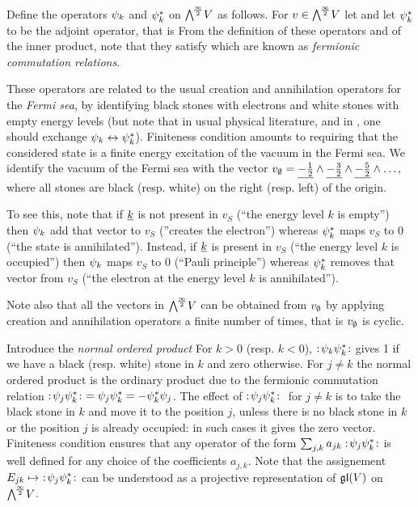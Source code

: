 \documentclass[../main/main.tex]{subfiles}
\begin{document}
Define the operators $\psi_k$ and $\psi_k^*$ on $\bigwedge^{\!\frac\infty2}\!V$ as follows. For $v\in\bigwedge^{\!\frac\infty2}\!V$ let
and let $\psi_k^*$ to be the adjoint operator, that is \st
{}
From the definition of these operators and of the inner product, note that they satisfy
which are known as \emph{fermionic commutation relations}. 

These operators are related to the usual creation and annihilation operators for the \emph{Fermi sea}, by identifying black stones with electrons and white stones with empty energy levels (but note that in usual physical literature, and in \cite{MJD}, one should exchange $\psi_k\leftrightarrow\psi_k^*$). Finiteness condition amounts to requiring that the considered state is a finite energy excitation of the vacuum in the Fermi sea. We identify the vacuum of the Fermi sea with the vector $v_\emptyset=\underline{-\frac12}\wedge\underline{-\frac32}\wedge\underline{-\frac52}\wedge\ldots$, where all stones are black (resp. white) on the right (resp. left) of the origin.

To see this, note that if $\underline{k}$ is not present in $v_S$ (``the energy level $k$ is empty'') then $\psi_k$ add that vector to $v_S$ (''creates the electron'') whereas $\psi_k^*$ maps $v_S$ to 0 (``the state is annihilated''). Instead, if $\underline{k}$ is present in $v_S$ (``the energy level $k$ is occupied'') then $\psi_k$ maps $v_S$ to 0 (``Pauli principle'') whereas $\psi_k^*$ removes that vector from $v_S$ (``the electron at the energy level $k$ is annihilated''). 

Note also that all the vectors in $\bigwedge^{\!\frac\infty2}\!V$ can be obtained from $v_\emptyset$ by applying creation and annihilation operators a finite number of times, that is $v_\emptyset$ is cyclic. 

Introduce the \emph{normal ordered product}
For $k>0$ (resp. $k<0$), $:\!{\psi_k\psi_k^*}\!:$ gives 1 if we have a black (resp. white) stone in $k$ and zero otherwise. For $j\neq k$ the normal ordered product is the ordinary product due to the fermionic commutation relation $\no{\p_j\p_k^*}\ =\p_j\p_k^*=-\p_k^*\p_j$. The effect of $:\!{\psi_j\psi_k^*}\!:\ $ for $j\neq k$ is to take the black stone in $k$ and move it to the position $j$, unless there is no black stone in $k$ or the position $j$ is already occupied: in such cases it gives the zero vector. Finiteness condition ensures that any operator of the form $\sum_{j,k}a_{jk}:\!{\psi_j\psi_k^*}\!:$ is well defined for any choice of the coefficients $a_{j,k}$. Note that the assignement $E_{jk}\mapsto\ \no{\p_j\p_k^*}$ can be understood as a projective representation of $\mathfrak g\mathfrak l(V)$ on $\bigwedge^{\!\frac\infty2}\!V$. 
\end{document}
